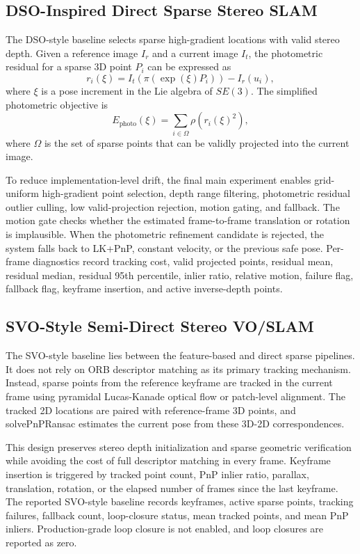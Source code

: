 \documentclass[11pt,a4paper]{article}
\begin{document}
\subsection{DSO-Inspired Direct Sparse Stereo SLAM}

The DSO-style baseline selects sparse high-gradient locations with valid stereo depth. Given a reference image $I_r$ and a current image $I_t$, the photometric residual for a sparse 3D point $P_i$ can be expressed as
\begin{equation}
  r_i(\xi)=I_t\left(\pi(\exp(\xi)P_i)\right)-I_r(u_i),
\end{equation}
where $\xi$ is a pose increment in the Lie algebra of $SE(3)$. The simplified photometric objective is
\begin{equation}
  E_{\mathrm{photo}}(\xi)=\sum_{i\in\Omega}\rho\left(r_i(\xi)^2\right),
\end{equation}
where $\Omega$ is the set of sparse points that can be validly projected into the current image.

To reduce implementation-level drift, the final main experiment enables grid-uniform high-gradient point selection, depth range filtering, photometric residual outlier culling, low valid-projection rejection, motion gating, and fallback. The motion gate checks whether the estimated frame-to-frame translation or rotation is implausible. When the photometric refinement candidate is rejected, the system falls back to LK+PnP, constant velocity, or the previous safe pose. Per-frame diagnostics record tracking cost, valid projected points, residual mean, residual median, residual 95th percentile, inlier ratio, relative motion, failure flag, fallback flag, keyframe insertion, and active inverse-depth points.

\subsection{SVO-Style Semi-Direct Stereo VO/SLAM}

The SVO-style baseline lies between the feature-based and direct sparse pipelines. It does not rely on ORB descriptor matching as its primary tracking mechanism. Instead, sparse points from the reference keyframe are tracked in the current frame using pyramidal Lucas-Kanade optical flow or patch-level alignment. The tracked 2D locations are paired with reference-frame 3D points, and solvePnPRansac estimates the current pose from these 3D-2D correspondences.

This design preserves stereo depth initialization and sparse geometric verification while avoiding the cost of full descriptor matching in every frame. Keyframe insertion is triggered by tracked point count, PnP inlier ratio, parallax, translation, rotation, or the elapsed number of frames since the last keyframe. The reported SVO-style baseline records keyframes, active sparse points, tracking failures, fallback count, loop-closure status, mean tracked points, and mean PnP inliers. Production-grade loop closure is not enabled, and loop closures are reported as zero.
\end{document}
